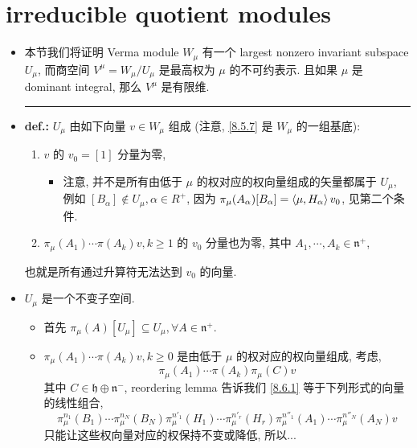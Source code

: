 \section{irreducible quotient modules}
\begin{itemize}
	\item 本节我们将证明 Verma module $W_\mu$ 有一个 largest nonzero invariant subspace $U_\mu$, 而商空间 $V^\mu = W_\mu / U_\mu$ 是最高权为 $\mu$ 的不可约表示. 且如果 $\mu$ 是 dominant integral, 那么 $V^\mu$ 是有限维.
	
	\noindent\rule[0.5ex]{\linewidth}{0.5pt} %
	
	\item \textbf{def.:} $U_\mu$ 由如下向量 $v \in W_\mu$ 组成 (注意, \eqref{8.5.7} 是 $W_\mu$ 的一组基底):
	\begin{enumerate}
		\item $v$ 的 $v_0 = [1]$ 分量为零,
		\begin{itemize}
			\item 注意, 并不是所有由低于 $\mu$ 的权对应的权向量组成的矢量都属于 $U_\mu$, 例如 $[B_\alpha] \notin U_\mu, \alpha \in R^+$, 因为 $\pi_\mu(A_\alpha) [B_\alpha] = \braket{\mu, H_\alpha} v_0$, 见第二个条件.
		\end{itemize}
		
		\item $\pi_\mu(A_1) \cdots \pi(A_k) v, k \geq 1$ 的 $v_0$ 分量也为零, 其中 $A_1, \cdots, A_k \in \mathfrak{n}^+$,
	\end{enumerate}
	也就是所有通过升算符无法达到 $v_0$ 的向量.
	
	\item $U_\mu$ 是一个不变子空间.
	
	\begin{tcolorbox}[title=proof:]
		\begin{itemize}
			\item 首先 $\pi_\mu(A)[U_\mu] \subseteq U_\mu, \forall A \in \mathfrak{n}^+$.
			
			\item $\pi_\mu(A_1) \cdots \pi(A_k) v, k \geq 0$ 是由低于 $\mu$ 的权对应的权向量组成, 考虑,
			\begin{equation} \label{8.6.1}
				\pi_\mu(A_1) \cdots \pi(A_k) \pi_\mu(C) v
			\end{equation}
			其中 $C \in \mathfrak{h} \oplus \mathfrak{n}^-$, reordering lemma 告诉我们 \eqref{8.6.1} 等于下列形式的向量的线性组合, 
			\begin{equation}
				\pi_\mu^{n_1}(B_1) \cdots \pi_\mu^{n_N}(B_N) \pi_\mu^{n'_1}(H_1) \cdots \pi_\mu^{n'_r}(H_r) \pi_\mu^{n''_1}(A_1) \cdots \pi_\mu^{n''_N}(A_N) v
			\end{equation}
			只能让这些权向量对应的权保持不变或降低, 所以...
		\end{itemize}
	\end{tcolorbox}
	

\end{itemize}
